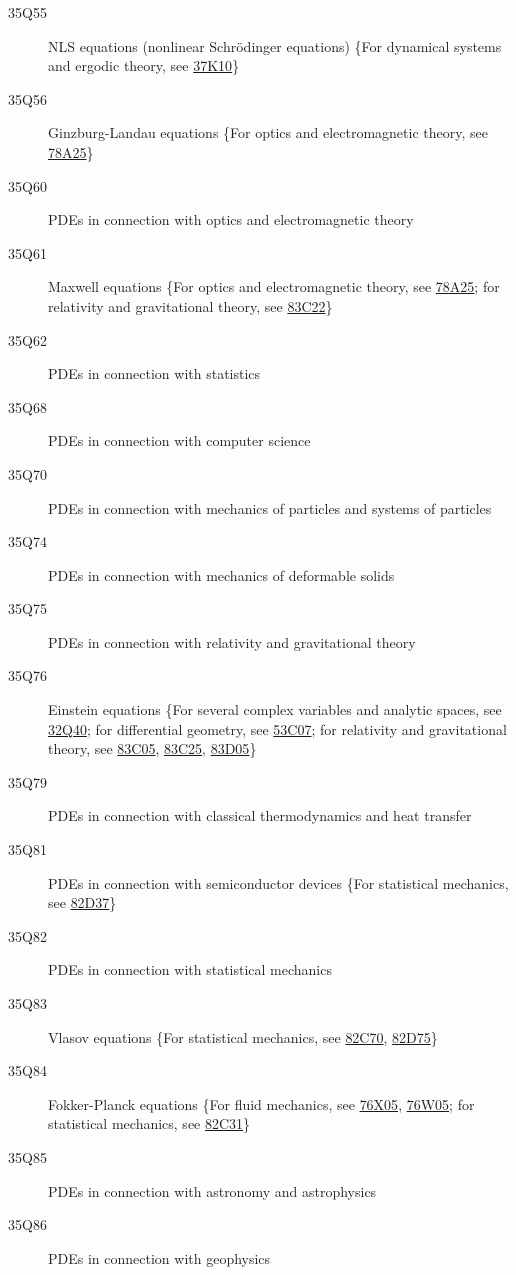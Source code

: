 \begin{description}
\item [35Q55]\label{35Q55} NLS equations (nonlinear Schr\"{o}dinger equations) \{For dynamical systems and ergodic theory, see \hyperref[37K10]{37K10}\}
\item [35Q56]\label{35Q56} Ginzburg-Landau equations \{For optics and electromagnetic theory, see \hyperref[78A25]{78A25}\}
\item [35Q60]\label{35Q60} PDEs in connection with optics and electromagnetic theory
\item [35Q61]\label{35Q61} Maxwell equations  \{For optics and electromagnetic theory, see \hyperref[78A25]{78A25}; for relativity and gravitational theory, see \hyperref[83C22]{83C22}\}
\item [35Q62]\label{35Q62} PDEs in connection with statistics
\item [35Q68]\label{35Q68} PDEs in connection with computer science
\item [35Q70]\label{35Q70} PDEs in connection with mechanics of particles and systems of particles
\item [35Q74]\label{35Q74} PDEs in connection with mechanics of deformable solids
\item [35Q75]\label{35Q75} PDEs in connection with relativity and gravitational theory
\item [35Q76]\label{35Q76} Einstein equations \{For several complex variables and analytic spaces, see \hyperref[32Q40]{32Q40}; for differential geometry, see \hyperref[53C07]{53C07}; for relativity and gravitational theory, see \hyperref[83C05]{83C05}, \hyperref[83C25]{83C25}, \hyperref[83D05]{83D05}\}
\item [35Q79]\label{35Q79} PDEs in connection with classical thermodynamics and heat transfer
\item [35Q81]\label{35Q81} PDEs in connection with semiconductor devices \{For statistical mechanics, see \hyperref[82D37]{82D37}\}
\item [35Q82]\label{35Q82} PDEs in connection with statistical mechanics
\item [35Q83]\label{35Q83} Vlasov equations \{For statistical mechanics, see \hyperref[82C70]{82C70}, \hyperref[82D75]{82D75}\}
\item [35Q84]\label{35Q84} Fokker-Planck equations \{For fluid mechanics, see \hyperref[76X05]{76X05}, \hyperref[76W05]{76W05}; for statistical mechanics, see \hyperref[82C31]{82C31}\}
\item [35Q85]\label{35Q85} PDEs in connection with astronomy and astrophysics
\item [35Q86]\label{35Q86} PDEs in connection with geophysics

\end{description}
